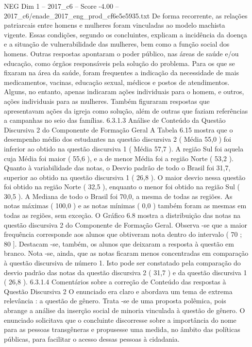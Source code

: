 \begin{textsample}{NEG Dim 1 – 2017\_c6 – Score -4.00 – 2017\_c6/enade\_2017\_eng\_prod\_cf6e5e5935.txt}
De forma recorrente, as relações patriarcais entre homens e mulheres foram vinculadas ao modelo machista vigente.
Essas condições, segundo os concluintes, explicam a incidência da doença e a situação de vulnerabilidade das mulheres, bem como a função social dos homens.
Outras respostas apontaram o poder público, nas áreas de saúde e/ou educação, como órgãos responsáveis pela solução do problema.
Para os que se fixaram na área da saúde, foram frequentes a indicação da necessidade de mais medicamentos, vacinas, educação sexual, médicos e postos de atendimentos.
Alguns, no entanto, apenas indicaram ações individuais para o homem, e outros, ações individuais para as mulheres.
Também figuraram respostas que apresentavam ações da igreja como solução, além de outras que faziam referências a campanhas no seio das famílias. 6.3.1.3 Análise de Conteúdo da Questão Discursiva 2 do Componente de Formação Geral A Tabela 6.15 mostra que o desempenho médio dos estudantes na questão discursiva 2 ( Média 55,0 ) foi inferior ao obtido na questão discursiva 1 ( Média 57,7 ).
A região Sul foi aquela cuja Média foi maior ( 55,6 ), e a de menor Média foi a região Norte ( 53,2 ).
Quanto à variabilidade das notas, o Desvio padrão de todo o Brasil foi 31,7, superior ao obtido na questão discursiva 1 ( 26,8 ).
O maior desvio nessa questão foi obtido na região Norte ( 32,5 ), enquanto o menor foi obtido na região Sul ( 30,5 ).
A Mediana de todo o Brasil foi 70,0, a mesma de todas as regiões.
As notas máximas ( 100,0 ) e as notas mínimas ( 0,0 ) também foram as mesmas em todas as regiões, sem exceção.
O Gráfico 6.8 mostra a distribuição das notas na questão discursiva 2 do Componente de Formação Geral.
Observa -se que a maior frequência corresponde aos alunos que obtiveram nota dentro do intervalo ( 70 ; 80 ].
Destacam -se, também, os alunos que deixaram a resposta à questão em branco.
Nota -se, ainda, que as notas ficaram menos concentradas em comparação à questão discursiva de número 1.
Isto pode ser constatado pela comparação do desvio padrão das notas da questão discursiva 2 ( 31,7 ) e da questão discursiva 1 ( 26,8 ). 6.3.1.4 Comentários sobre a correção de Conteúdo das respostas à Questão Discursiva 2 O enunciado era claro e abordava um tema de extrema relevância : a questão de gênero.
Trata -se de uma proposta polêmica, pois abrange a análise da inserção social de minoria vinculada à questão de gênero.
O enunciado solicitava que o concluinte discorresse sobre a importância do nome para as pessoas transgêneras e propusesse uma medida, no âmbito das políticas públicas, para facilitar o acesso dessas pessoas à cidadania.

\end{textsample}
